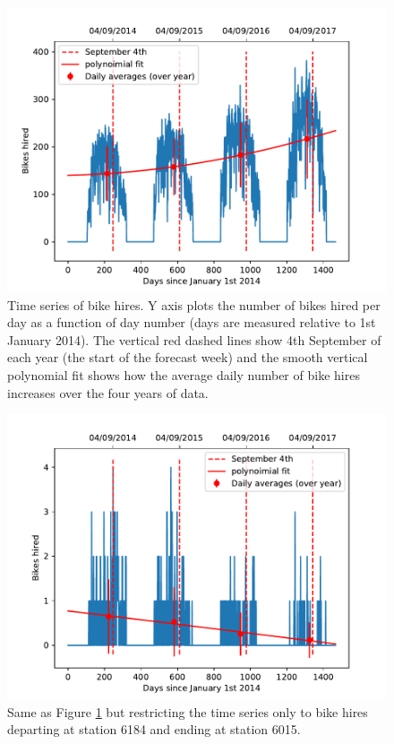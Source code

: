 \documentclass[10pt]{article}
\begin{document}
\begin{figure}
\begin{center}
\includegraphics[scale=1.0,angle=0,trim=0cm 0cm 0cm 0cm]{ts_plot.pdf}
\caption{Time series of bike hires. Y axis plots the number of bikes hired per day as a function of day number (days are measured relative to 1st January 2014). The vertical red dashed lines show 4th September of each year (the start of the forecast week) and the smooth vertical polynomial fit shows how the average daily number of bike hires increases over the four years of data.}
\label{fig_ts}
\end{center}
\end{figure}
\begin{figure}
\begin{center}
\includegraphics[scale=1.0,angle=0,trim=0cm 0cm 0cm 0cm]{ts_plot_station.pdf}
\caption{Same as Figure \ref{fig_ts} but restricting the time series only to bike hires departing at station 6184 and ending at station 6015.}
\label{fig_ts_station}
\end{center}
\end{figure}
\end{document}
